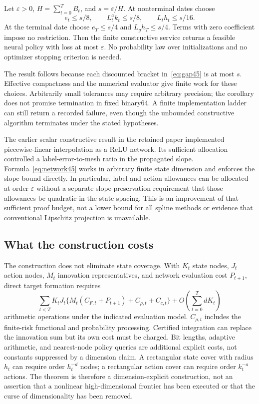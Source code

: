 \begin{corollary}\label{cor:termination45}
Let $\varepsilon>0$, $H=\sum_{t=0}^TB_t$, and $s=\varepsilon/H$. At nonterminal dates choose
\begin{equation}\label{eq:budget45}
 e_t\le s/8,\qquad L^a_tk_t\le s/8,\qquad L_th_t\le s/16.
\end{equation}
At the terminal date choose $e_T\le s/4$ and $L_gh_T\le s/4$. Terms with zero coefficient impose no restriction. Then the finite constructive service returns a feasible neural policy with loss at most $\varepsilon$. No probability law over initializations and no optimizer stopping criterion is needed.
\end{corollary}
The result follows because each discounted bracket in~\eqref{eq:gap45} is at most $s$. Effective compactness and the numerical evaluator give finite work for these choices. Arbitrarily small tolerances may require arbitrary precision; the corollary does not promise termination in fixed binary64. A finite implementation ladder can still return a recorded failure, even though the unbounded constructive algorithm terminates under the stated hypotheses.

The earlier scalar constructive result in the retained paper implemented piecewise-linear interpolation as a ReLU network. Its sufficient allocation controlled a label-error-to-mesh ratio in the propagated slope. Formula~\eqref{eq:network45} works in arbitrary finite state dimension and enforces the slope bound directly. In particular, label and action allowances can be allocated at order $\varepsilon$ without a separate slope-preservation requirement that those allowances be quadratic in the state spacing. This is an improvement of that sufficient proof budget, not a lower bound for all spline methods or evidence that conventional Lipschitz projection is unavailable.

\subsection{What the construction costs}
The construction does not eliminate state coverage. With $K_t$ state nodes, $J_t$ action nodes, $M_t$ innovation representatives, and network evaluation cost $P_{t+1}$, direct target formation requires
\begin{equation}\label{eq:work45}
 \sum_{t<T}K_tJ_t\{M_t(C_{F,t}+P_{t+1})+C_{\rho,t}+C_{c,t}\}
       +O\!\left(\sum_{t=0}^T dK_t\right)
\end{equation}
arithmetic operations under the indicated evaluation model. $C_{\rho,t}$ includes the finite-risk functional and probability processing. Certified integration can replace the innovation sum but its own cost must be charged. Bit lengths, adaptive arithmetic, and nearest-node policy queries are additional explicit costs, not constants suppressed by a dimension claim. A rectangular state cover with radius $h_t$ can require order $h_t^{-d}$ nodes; a rectangular action cover can require order $k_t^{-a}$ actions. The theorem is therefore a dimension-explicit construction, not an assertion that a nonlinear high-dimensional frontier has been executed or that the curse of dimensionality has been removed.


